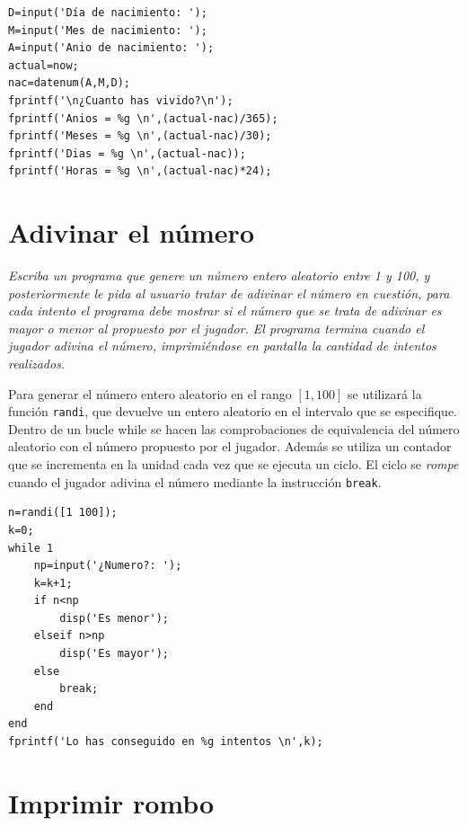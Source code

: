 \sol

\begin{verbatim}
D=input('Día de nacimiento: ');
M=input('Mes de nacimiento: ');
A=input('Anio de nacimiento: ');
actual=now;
nac=datenum(A,M,D);
fprintf('\n¿Cuanto has vivido?\n');
fprintf('Anios = %g \n',(actual-nac)/365);
fprintf('Meses = %g \n',(actual-nac)/30);
fprintf('Dias = %g \n',(actual-nac));
fprintf('Horas = %g \n',(actual-nac)*24);
\end{verbatim}


\section{Adivinar el número}

\textit{Escriba un programa que genere un número entero aleatorio entre 1 y 100, y posteriormente le pida al usuario tratar de adivinar el número en cuestión, para cada intento el programa debe mostrar si el número que se trata de adivinar es mayor o menor al propuesto por el jugador. El programa termina cuando el jugador adivina el número, imprimiéndose en pantalla la cantidad de intentos realizados.}

\sol

Para generar el número entero aleatorio en el rango $[1,100]$ se utilizará la función \texttt{randi}, que devuelve un 
entero aleatorio en el intervalo que se especifique. Dentro de un bucle while se hacen las comprobaciones de equivalencia 
del número aleatorio con el número propuesto por el jugador. Además se utiliza un contador que se incrementa en la unidad 
cada vez que se ejecuta un ciclo. El ciclo se \textit{rompe} cuando el jugador adivina el número mediante la 
instrucción \texttt{break}.

\begin{verbatim}
n=randi([1 100]);
k=0;
while 1
    np=input('¿Numero?: ');
    k=k+1;
    if n<np
        disp('Es menor');
    elseif n>np
        disp('Es mayor');
    else
        break;
    end
end
fprintf('Lo has conseguido en %g intentos \n',k);
\end{verbatim}

\section{Imprimir rombo} 

